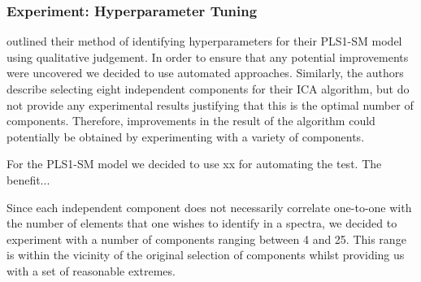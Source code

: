 \subsubsection{Experiment: Hyperparameter Tuning}\label{sec:experiment_hyperparameter_tuning}
\citet{cleggRecalibrationMarsScience2017} outlined their method of identifying hyperparameters for their PLS1-SM model using qualitative judgement. 
In order to ensure that any potential improvements were uncovered we decided to use automated approaches.
Similarly, the authors describe selecting eight independent components for their ICA algorithm, but do not provide any experimental results justifying that this is the optimal number of components.
Therefore, improvements in the result of the algorithm could potentially be obtained by experimenting with a variety of components. 

For the PLS1-SM model we decided to use xx for automating the test. The benefit...

Since each independent component does not necessarily correlate one-to-one with the number of elements that one wishes to identify in a spectra, we decided to experiment with a number of components ranging between 4 and 25. 
This range is within the vicinity of the original selection of components whilst providing us with a set of reasonable extremes.
